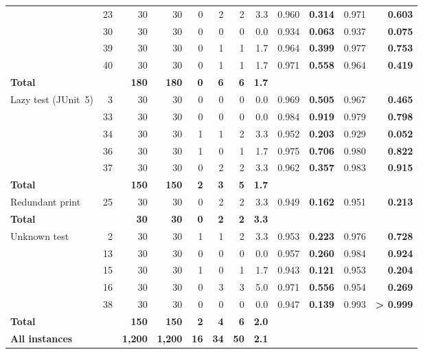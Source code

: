\begin{xltabular}{\linewidth}{l r r r r r r r r r r r}
     & 23 & 30 & 30 & 0 & 2 & 2 & 3.3 & 0.960 & \textbf{0.314} & 0.971 & \textbf{0.603} \\
     & 30 & 30 & 30 & 0 & 0 & 0 & 0.0 & 0.934 & \textbf{0.063} & 0.937 & \textbf{0.075} \\
     & 39 & 30 & 30 & 0 & 1 & 1 & 1.7 & 0.964 & \textbf{0.399} & 0.977 & \textbf{0.753} \\
     & 40 & 30 & 30 & 0 & 1 & 1 & 1.7 & 0.971 & \textbf{0.558} & 0.964 & \textbf{0.419} \\
    \textbf{Total} & & \textbf{180} & \textbf{180} & \textbf{0} & \textbf{6} & \textbf{6} & \textbf{1.7} & & & & \\
  \midrule
    Lazy test (JUnit~5) & 3 & 30 & 30 & 0 & 0 & 0 & 0.0 & 0.969 & \textbf{0.505} & 0.967 & \textbf{0.465} \\
     & 33 & 30 & 30 & 0 & 0 & 0 & 0.0 & 0.984 & \textbf{0.919} & 0.979 & \textbf{0.798} \\
     & 34 & 30 & 30 & 1 & 1 & 2 & 3.3 & 0.952 & \textbf{0.203} & 0.929 & \textbf{0.052} \\
     & 36 & 30 & 30 & 1 & 0 & 1 & 1.7 & 0.975 & \textbf{0.706} & 0.980 & \textbf{0.822} \\
     & 37 & 30 & 30 & 0 & 2 & 2 & 3.3 & 0.962 & \textbf{0.357} & 0.983 & \textbf{0.915} \\
    \textbf{Total} & & \textbf{150} & \textbf{150} & \textbf{2} & \textbf{3} & \textbf{5} & \textbf{1.7} & & & & \\
  \midrule
    Redundant print & 25 & 30 & 30 & 0 & 2 & 2 & 3.3 & 0.949 & \textbf{0.162} & 0.951 & \textbf{0.213} \\
    \textbf{Total} & & \textbf{30} & \textbf{30} & \textbf{0} & \textbf{2} & \textbf{2} & \textbf{3.3} & & & & \\
  \midrule
    Unknown test & 2 & 30 & 30 & 1 & 1 & 2 & 3.3 & 0.953 & \textbf{0.223} & 0.976 & \textbf{0.728} \\
     & 13 & 30 & 30 & 0 & 0 & 0 & 0.0 & 0.957 & \textbf{0.260} & 0.984 & \textbf{0.924} \\
     & 15 & 30 & 30 & 1 & 0 & 1 & 1.7 & 0.943 & \textbf{0.121} & 0.953 & \textbf{0.204} \\
     & 16 & 30 & 30 & 0 & 3 & 3 & 5.0 & 0.971 & \textbf{0.556} & 0.954 & \textbf{0.269} \\
     & 38 & 30 & 30 & 0 & 0 & 0 & 0.0 & 0.947 & \textbf{0.139} & 0.993 & \textbf{> 0.999} \\
    \textbf{Total} & & \textbf{150} & \textbf{150} & \textbf{2} & \textbf{4} & \textbf{6} & \textbf{2.0} & & & & \\
    \midrule
    \textbf{All instances} & & \textbf{1,200} & \textbf{1,200} & \textbf{16} & \textbf{34} & \textbf{50} & \textbf{2.1} & & & & \\
    \bottomrule
  \end{xltabular}


